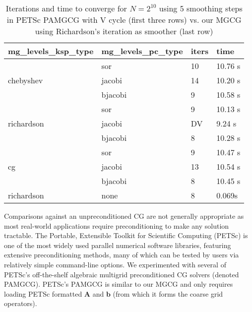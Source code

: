 \begin{table}
\caption{Iterations and time to converge for $N=2^{10}$ using 5 smoothing steps in PETSc PAMGCG with V cycle (first three rows) vs. our MGCG using Richardson's iteration as smoother (last row)}
\begin{center}
\small\sf\centering
\begin{tabular}{llll}
\toprule
mg\_levels\_ksp\_type & mg\_levels\_pc\_type & iters & time \\
\midrule
\multirow{3}{*}{chebyshev}  & sor     & 10 & 10.76 s \\ 
                            & jacobi  & 14 & 10.20 s \\ 
                            & bjacobi & 9 & 10.58 s \\ \midrule
\multirow{3}{*}{richardson} & sor     & 9 & 10.13 s \\ 
                            & jacobi  & DV & 9.24 s \\  
                            & bjacobi & 8 & 10.28 s \\ \midrule
\multirow{3}{*}{cg}         & sor     & 9 & 10.47 s \\ 
                            & jacobi  & 13 & 10.54 s \\ 
                            & bjacobi & 8 & 10.45 s \\ \midrule
 richardson & none & 8 & 0.069s\\
\bottomrule
\end{tabular}
\end{center}
\label{table:petsc_5}
\end{table}




Comparisons against an unpreconditioned CG are not generally appropriate as most real-world applications require preconditioning to make any solution tractable. The Portable, Extensible Toolkit for Scientific Computing (PETSc) \citep{petsc-web-page} is one of the most widely used parallel numerical software libraries, featuring extensive preconditioning methods, many of which can be tested by users via relatively simple command-line options.  We experimented with several of PETSc's off-the-shelf algebraic multigrid preconditioned CG solvers (denoted PAMGCG). PETSc's PAMGCG is similar to our MGCG and only requires loading PETSc formatted $\mathbf{A}$ and $\mathbf{b}$ (from which it forms the coarse grid operators). 


